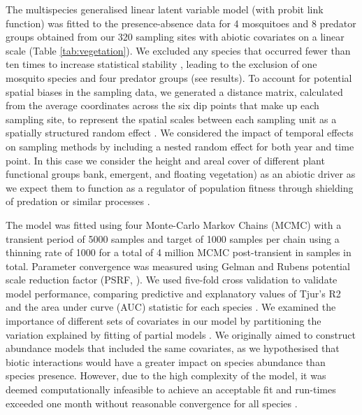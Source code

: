 \documentclass[lineno,sn-basic]{sn-jnl}%
\begin{document}
The multispecies generalised linear latent variable model (with probit link function) was fitted to the presence-absence data for 4 mosquitoes and 8 predator groups obtained from our 320 sampling sites with abiotic covariates on a linear scale (Table \ref{tab:vegetation}). We excluded any species that occurred fewer than ten times to increase statistical stability \citep{ovaskainenJointSpeciesDistribution2020}, leading to the exclusion of one mosquito species and four predator groups (see results). To account for potential spatial biases in the sampling data, we generated a distance matrix, calculated from the average coordinates across the six dip points that make up each sampling site, to represent the spatial scales between each sampling unit as a spatially structured random effect \citep{f.dormannMethodsAccountSpatial2007}. We considered the impact of temporal effects on sampling methods by including a nested random effect for both year and time point. In this case we consider the height and areal cover of different plant functional groups bank, emergent, and floating vegetation) as an abiotic driver as we expect them to function as a regulator of population fitness through shielding of predation or similar processes \citep{sahaHabitatComplexityReduces2009}.

The model was fitted using four Monte-Carlo Markov Chains (MCMC) with a transient period of 5000 samples and target of 1000 samples per chain using a thinning rate of 1000 for a total of 4 million MCMC post-transient in samples in total. Parameter convergence was measured using Gelman and Rubens potential scale reduction factor (PSRF, \cite{gelmanInferenceIterativeSimulation1992}). We used five-fold cross validation to validate model performance, comparing predictive and explanatory values of Tjur’s R2 and the area under curve (AUC) statistic for each species \citep{loboAUCMisleadingMeasure2008, tjurCoefficientsDeterminationLogistic2009}. We examined the importance of different sets of covariates in our model by partitioning the variation explained by fitting of partial models \citep{borcardPartiallingOutSpatial1992, ovaskainenJointSpeciesDistribution2020}. We originally aimed to construct abundance models that included the same covariates, as we hypothesised that biotic interactions would have a greater impact on species abundance than species presence. However, due to the high complexity of the model, it was deemed computationally infeasible to achieve an acceptable fit and run-times exceeded one month without reasonable convergence for all species \citep{howardImprovingSpeciesDistribution2014}.
\end{document}
